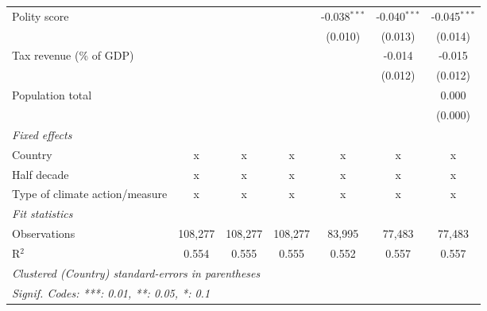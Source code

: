 \begin{tabular}{lcccccc}
   Polity score                                              &         &                &                & -0.038$^{***}$ & -0.040$^{***}$ & -0.045$^{***}$\\   
                                                             &         &                &                & (0.010)        & (0.013)        & (0.014)\\   
   Tax revenue (\% of GDP)                                   &         &                &                &                & -0.014         & -0.015\\   
                                                             &         &                &                &                & (0.012)        & (0.012)\\   
   Population total                                          &         &                &                &                &                & 0.000\\   
                                                             &         &                &                &                &                & (0.000)\\   
   \emph{Fixed effects}\\
   Country                                                   & x       & x              & x              & x              & x              & x\\  
   Half decade                                               & x       & x              & x              & x              & x              & x\\  
   Type of climate action/measure                            & x       & x              & x              & x              & x              & x\\  
   \midrule \emph{Fit statistics}\\
   Observations                                              & 108,277 & 108,277        & 108,277        & 83,995         & 77,483         & 77,483\\  
   R$^2$                                                     & 0.554   & 0.555          & 0.555          & 0.552          & 0.557          & 0.557\\  
   \midrule
   \multicolumn{7}{l}{\emph{Clustered (Country) standard-errors in parentheses}}\\
   \multicolumn{7}{l}{\emph{Signif. Codes: ***: 0.01, **: 0.05, *: 0.1}}\\
\end{tabular}
\par\endgroup


